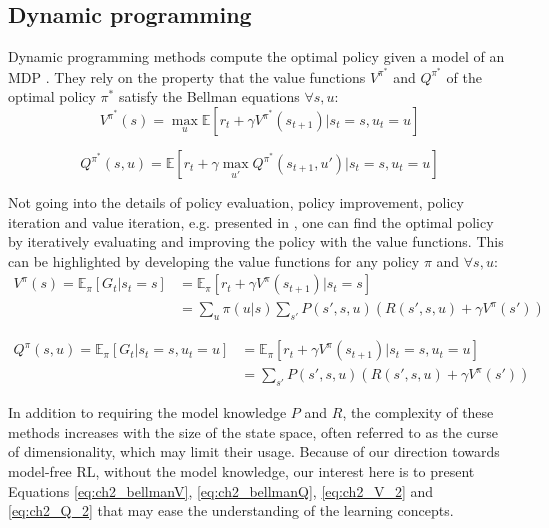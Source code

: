 
\subsection{Dynamic programming}
Dynamic programming \citep{bellman1966dynamic} methods compute the optimal policy given a model of an MDP \citep{sutton2018reinforcement}.
They rely on the property that the value functions $V^{\pi^*}$ and $Q^{\pi^*}$ of the optimal policy ${\pi^*}$ satisfy the Bellman equations $\forall s, u$:
\begin{equation}
\label{eq:ch2_bellmanV}
    V^{\pi^*}(s) = \max_u \mathbb{E}[r_t + \gamma V^{\pi^*}(s_{t+1})| s_t=s, u_t=u]
\end{equation}

\begin{equation}
\label{eq:ch2_bellmanQ}
    Q^{\pi^*}(s, u) = \mathbb{E}[r_t + \gamma \max_{u'} Q^{\pi^*}(s_{t+1}, u') |s_t=s, u_t=u]
\end{equation}

Not going into the details of policy evaluation, policy improvement, policy iteration and value iteration, e.g. presented in \citep{sutton2018reinforcement}, one can find the optimal policy by iteratively evaluating and improving the policy with the value functions.
This can be highlighted by developing the value functions for any policy $\pi$ and $\forall s, u$:
\begin{equation}
\label{eq:ch2_V_2}
\begin{split}
    V^\pi(s)= \mathbb{E}_{\pi}\left[G_t|s_t=s\right] & = \mathbb{E}_{\pi}\left[r_t + \gamma V^\pi(s_{t+1})|s_t=s\right]\\
     & = \sum_{u} \pi(u|s) \sum_{s'} P(s', s, u) (R(s', s, u) + \gamma V^\pi(s'))
\end{split}
\end{equation}

\begin{equation}
\label{eq:ch2_Q_2}
\begin{split}
    Q^\pi(s, u) = \mathbb{E}_{\pi}\left[G_t|s_t=s, u_t=u\right] & = \mathbb{E}_{\pi}\left[r_t + \gamma V^\pi(s_{t+1})|s_t=s, u_t=u \right] \\
    &  = \sum_{s'} P(s', s, u) (R(s', s, u) + \gamma V^\pi(s'))
\end{split}
\end{equation}

In addition to requiring the model knowledge $P$ and $R$, the complexity of these methods increases with the size of the state space, often referred to as the curse of dimensionality, which may limit their usage.
Because of our direction towards model-free RL, without the model knowledge, our interest here is to present Equations \ref{eq:ch2_bellmanV}, \ref{eq:ch2_bellmanQ}, \ref{eq:ch2_V_2} and \ref{eq:ch2_Q_2} that may ease the understanding of the learning concepts.


